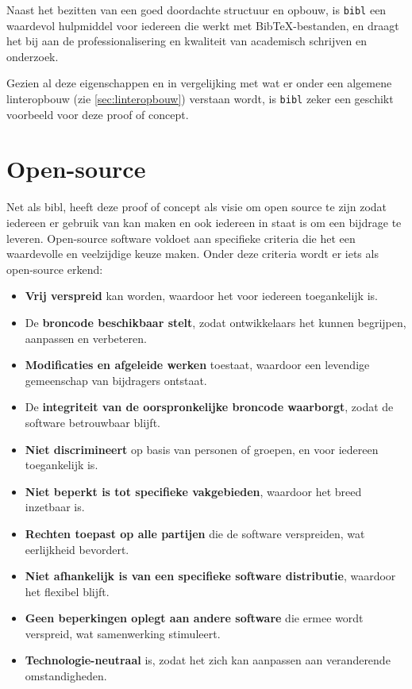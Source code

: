 Naast het bezitten van een goed doordachte structuur en opbouw, is \texttt{bibl} een waardevol hulpmiddel voor iedereen die werkt met BibTeX-bestanden, en draagt het bij aan de professionalisering en kwaliteit van academisch schrijven en onderzoek.

Gezien al deze eigenschappen en in vergelijking met wat er onder een algemene linteropbouw (zie \ref{sec:linteropbouw}) verstaan wordt, is \texttt{bibl} zeker een geschikt voorbeeld voor deze proof of concept. 

\section{Open-source}
Net als bibl, heeft deze proof of concept als visie om open source te zijn zodat iedereen er gebruik van kan maken en ook iedereen in staat is om een bijdrage te leveren.
Open-source software voldoet aan specifieke criteria die het een waardevolle en veelzijdige keuze maken. Onder deze criteria wordt er iets als open-source erkend:
\begin{itemize}
    \item \textbf{Vrij verspreid} kan worden, waardoor het voor iedereen toegankelijk is.
    \item De \textbf{broncode beschikbaar stelt}, zodat ontwikkelaars het kunnen begrijpen, aanpassen en verbeteren.
    \item \textbf{Modificaties en afgeleide werken} toestaat, waardoor een levendige gemeenschap van bijdragers ontstaat.
    \item De \textbf{integriteit van de oorspronkelijke broncode waarborgt}, zodat de software betrouwbaar blijft.
    \item \textbf{Niet discrimineert} op basis van personen of groepen, en voor iedereen toegankelijk is.
    \item \textbf{Niet beperkt is tot specifieke vakgebieden}, waardoor het breed inzetbaar is.
    \item \textbf{Rechten toepast op alle partijen} die de software verspreiden, wat eerlijkheid bevordert.
    \item \textbf{Niet afhankelijk is van een specifieke software distributie}, waardoor het flexibel blijft.
    \item \textbf{Geen beperkingen oplegt aan andere software} die ermee wordt verspreid, wat samenwerking stimuleert.
    \item \textbf{Technologie-neutraal} is, zodat het zich kan aanpassen aan veranderende omstandigheden.
\end{itemize}

